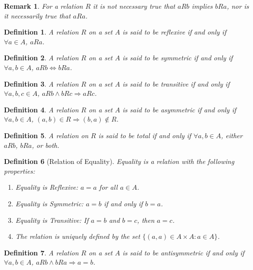 \documentclass[12pt,oneside]{book}
\theoremstyle{mystyle}
\newtheorem{definition}{Definition}[section]
\newtheorem{remark}{Remark}[section]
\begin{document}
\begin{remark}
For a relation $R$ it is not necessary true that $aRb$ implies $bRa$, nor is it necessarily true that $aRa$.
\end{remark}

\begin{definition}
A relation $R$ on a set $A$ is said to be reflexive if and only if $\forall a\in A$, $aRa$.
\end{definition}

\begin{definition}
A relation $R$ on a set $A$ is said to be symmetric if and only if $\forall a,b\in A$, $aRb\Leftrightarrow bRa$.
\end{definition}

\begin{definition}
A relation $R$ on a set $A$ is said to be transitive if and only if $\forall a,b,c\in A$, $aRb \land bRc \Rightarrow aRc$.
\end{definition}

\begin{definition}
A relation $R$ on a set $A$ is said to be asymmetric if and only if $\forall a,b\in A$, $(a,b)\in R\Rightarrow (b,a) \notin R$.
\end{definition}

\begin{definition}
A relation on $R$ is said to be total if and only if $\forall a,b \in A$, either $aRb$, $bRa$, or both.
\end{definition}

\begin{definition}[Relation of Equality]
Equality is a relation with the following properties:
\begin{enumerate}
\item Equality is Reflexive: $a=a$ for all $a\in A$.
\item Equality is Symmetric: $a=b$ if and only if $b=a$.
\item Equality is Transitive: If $a=b$ and $b=c$, then $a=c$.
\item The relation is uniquely defined by the set $\{(a,a)\in A\times A:a\in A\}$.
\end{enumerate}
\end{definition}

\begin{definition}
A relation $R$ on a set $A$ is said to be antisymmetric if and only if $\forall a,b \in A$, $aRb\land bRa\Rightarrow a=b$.
\end{definition}
\end{document}
